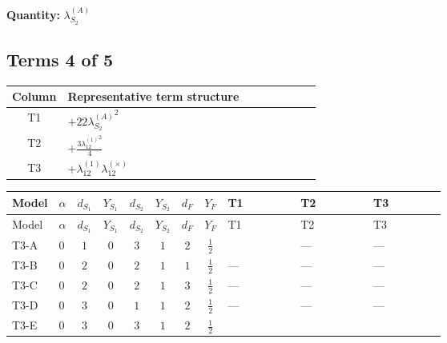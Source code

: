 \documentclass[8pt]{article}
\begin{document}
\begin{landscape}
\begin{longtable}{@{}llcccccc >{\raggedright\arraybackslash}p{0.21\linewidth} >{\raggedright\arraybackslash}p{0.21\linewidth} >{\raggedright\arraybackslash}p{0.21\linewidth}@{}}
\midrule
\bottomrule
\end{longtable}
\clearpage
\noindent\textbf{Quantity: }$\lambda_{S_2}^{(A)}$\par\smallskip
\subsection*{Terms 4 of 5}
\begin{center}
\begin{tabular}{@{}c >{\raggedright\arraybackslash}p{0.82\linewidth}@{}}
\toprule
Column & Representative term structure \\
\midrule
T1 & \(\displaystyle +22 {\lambda_{S_2}^{(A)}}^2\) \\
\midrule
T2 & \(\displaystyle +\frac{3 {\lambda_{12}^{(1)}}^2}{4}\) \\
\midrule
T3 & \(\displaystyle +{\lambda_{12}^{(1)}} {\lambda_{12}^{(\times)}}\) \\
\midrule
\bottomrule
\end{tabular}
\end{center}
\smallskip
\tiny
\begin{longtable}{@{}llcccccc >{\raggedright\arraybackslash}p{0.21\linewidth} >{\raggedright\arraybackslash}p{0.21\linewidth} >{\raggedright\arraybackslash}p{0.21\linewidth}@{}}
\toprule
Model & $\alpha$ & $d_{S_1}$ & $Y_{S_1}$ & $d_{S_2}$ & $Y_{S_2}$ & $d_F$ & $Y_F$ & T1 & T2 & T3 \\
\midrule
\endfirsthead
\toprule
Model & $\alpha$ & $d_{S_1}$ & $Y_{S_1}$ & $d_{S_2}$ & $Y_{S_2}$ & $d_F$ & $Y_F$ & T1 & T2 & T3 \\
\midrule
\endhead
T3-A & $0$ & $1$ & $0$ & $3$ & $1$ & $2$ & $\frac{1}{2}$ & \scriptsize\adjustbox{max width=\linewidth}{$\begin{gathered} +22 {\lambda_{S_2}^{(A)}}^2\end{gathered}$} & --- & --- \\
\midrule
T3-B & $0$ & $2$ & $0$ & $2$ & $1$ & $1$ & $\frac{1}{2}$ & --- & --- & --- \\
\midrule
T3-C & $0$ & $2$ & $0$ & $2$ & $1$ & $3$ & $\frac{1}{2}$ & --- & --- & --- \\
\midrule
T3-D & $0$ & $3$ & $0$ & $1$ & $1$ & $2$ & $\frac{1}{2}$ & --- & --- & --- \\
\midrule
T3-E & $0$ & $3$ & $0$ & $3$ & $1$ & $2$ & $\frac{1}{2}$ & \scriptsize\adjustbox{max width=\linewidth}{$\begin{gathered} +22 {\lambda_{S_2}^{(A)}}^2\end{gathered}$} & \scriptsize\adjustbox{max width=\linewidth}{$\begin{gathered} +\frac{3 {\lambda_{12}^{(1)}}^2}{4}\end{gathered}$} & \scriptsize\adjustbox{max width=\linewidth}{$\begin{gathered} +{\lambda_{12}^{(1)}} {\lambda_{12}^{(\times)}}\end{gathered}$} \\

\end{longtable}
\end{landscape}
\end{document}
